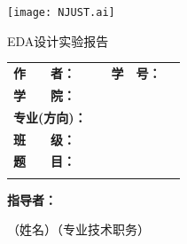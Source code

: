 \documentclass[twoside, openright]{article}
\begin{document}

\newcommand{\Title}{EDA设计实验报告}

\begin{titlepage}
	\centering
	\begin{spacing}{1}
		\vspace{0.5\ccwd}

		\vspace{1\ccwd}

		\texttt{[image: NJUST.ai]}

		\vspace{0.2\ccwd}

		\fontsize{45pt}{45pt}\selectfont\heiti
		\Title

		\vspace{2\ccwd}
	\end{spacing}

	\begin{spacing}{1.5}
		\begin{tabu} to 12.59cm{@{}X[c, 3.2cm]@{}X[c, 4cm]@{}X[c, 2.22cm]@{}X[c, 3.89cm]@{}}
			\textbf{作　　者：} & \underline{} & \textbf{学　号：} & \underline{} \\
			\textbf{学　　院：} &  \\
			\textbf{专业(方向)：} &  \\
			\textbf{班　　级：} &  \\
			\textbf{题　　目：} &  \\
			\textbf{} & 
		\end{tabu}
		\vspace{0em}
	\end{spacing}

	\begin{spacing}{1}
		\vspace{3\ccwd}

		\textbf{指导者：}\underline{\makebox[15.5\ccwd][c]{}}

		\hspace{5em}（姓名）\hspace{11em}（专业技术职务）


\end{spacing}
\end{titlepage}
\end{document}
